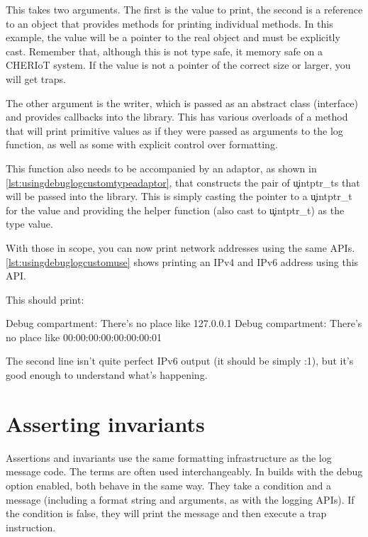{This takes two arguments.
The first is the value to print, the second is a reference to an object that provides methods for printing individual methods.
In this example, the value will be a pointer to the real object and must be explicitly cast.
Remember that, although this is not type safe, it  memory safe on a CHERIoT system.
If the value is not a pointer of the correct size or larger, you will get traps.

The other argument is the writer, which is passed as an abstract class (interface) and provides callbacks into the  library.
This has various overloads of a  method that will print primitive values as if they were passed as arguments to the log function, as well as some with explicit control over formatting.

This function also needs to be accompanied by an adaptor, as shown in \ref{lst:usingdebuglogcustomtypeadaptor}, that constructs the pair of \c{uintptr_t}s that will be passed into the library.
This is simply casting the pointer to a \c{uintptr_t} for the value and providing the helper function (also cast to \c{uintptr_t}) as the type value.

\codelisting[filename=examples/debug_helpers/example.cc,marker=type_adaptor,label=lst:usingdebuglogcustomtypeadaptor,caption="Defining an adaptor for a custom type."]{}

With those in scope, you can now print network addresses using the same APIs.
\ref{lst:usingdebuglogcustomuse} shows printing an IPv4 and IPv6 address using this API.

\codelisting[filename=examples/debug_helpers/example.cc,marker=custom_log,label=lst:usingdebuglogcustomuse,caption="Printing a custom type with the debug APIs."]{}

This should print:

\begin{console}
Debug compartment: There's no place like 127.0.0.1
Debug compartment: There's no place like 00:00:00:00:00:00:00:01
\end{console}

The second line isn't quite perfect IPv6 output (it should be simply :1), but it's good enough to understand what's happening.

\section{Asserting invariants}

Assertions and invariants use the same formatting infrastructure as the log message code.
The terms are often used interchangeably.
In builds with the debug option enabled, both behave in the same way.
They take a condition and a message (including a format string and arguments, as with the logging APIs).
If the condition is false, they will print the message and then execute a trap instruction.

}
